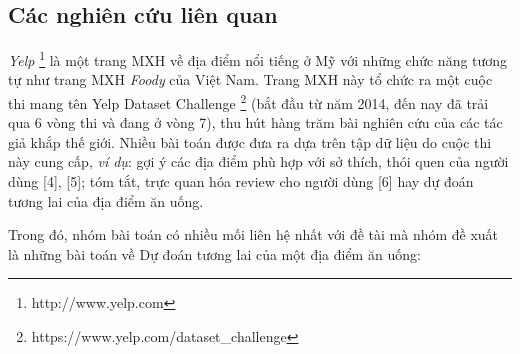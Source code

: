 \documentclass[12pt]{extarticle}
\begin{document}
		\subsection{Các nghiên cứu liên quan}
			\par \textit{Yelp} \footnote[1]{http://www.yelp.com} là một trang MXH về địa điểm nổi tiếng ở Mỹ với những chức năng tương tự như trang MXH \textit{Foody}  của Việt Nam. Trang MXH này tổ chức ra một cuộc thi mang tên Yelp Dataset Challenge \footnote[2]{https://www.yelp.com/dataset\_challenge} (bắt đầu từ năm 2014, đến nay đã trải qua 6 vòng thi và đang ở vòng 7), thu hút hàng trăm bài nghiên cứu của các tác giả khắp thế giới. Nhiều bài toán được đưa ra dựa trên tập dữ liệu do cuộc thi này cung cấp, \textit{ví dụ}: gợi ý các địa điểm phù hợp với sở thích, thói quen của người dùng [4], [5]; tóm tắt, trực quan hóa review cho người dùng [6] hay dự đoán tương lai của địa điểm ăn uống.
			\par Trong đó, nhóm bài toán có nhiều mối liên hệ nhất với đề tài mà nhóm đề xuất là những bài toán về Dự đoán tương lai của một địa điểm ăn uống:
\end{document}
